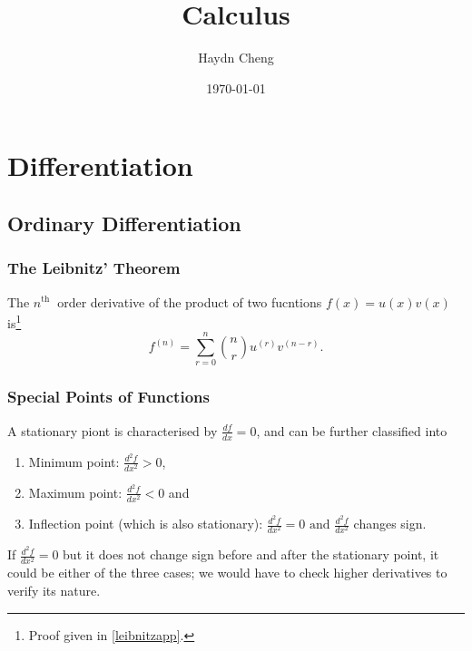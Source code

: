 \documentclass[english,a4paper,12pt]{report}
\title{Calculus}
\author{Haydn Cheng}
\date{\today}
\begin{document}
\maketitle
\tableofcontents

\chapter{Differentiation}

\section{Ordinary Differentiation}

\subsection{The Leibnitz' Theorem} \label{leibnitz} 
\begin{theorem}
    The \(n^{\text{th }} \) order derivative of the product of two fucntions \(f(x) = u(x)v(x)\) is\footnote{Proof given in \cref{leibnitzapp}.}  
    \begin{equation}
        f^{(n)} = \sum_{r=0}^{n} \binom{n}{r} u^{(r)} v^{(n-r)}. \label{lei} 
    \end{equation}
\end{theorem}

\subsection{Special Points of Functions}

A stationary piont is characterised by \(\displaystyle \frac{df}{dx} = 0\), and can be further classified into 

\begin{enumerate}
    \item Minimum point: \(\displaystyle \frac{d^2f}{dx^2} > 0\),
    \item Maximum point: \(\displaystyle \frac{d^2f}{dx^2} < 0\) and
    \item Inflection point (which is also stationary): \(\displaystyle \frac{d^2f}{dx^2} = 0 \text { and }  \frac{d^2f}{dx^2} \)  changes sign.
\end{enumerate}

If \(\displaystyle \frac{d^2f}{dx^2} = 0\) but it does not change sign before and after the stationary point, it could be either of the three cases; we would have to check higher derivatives to verify its nature. 
\end{document}
